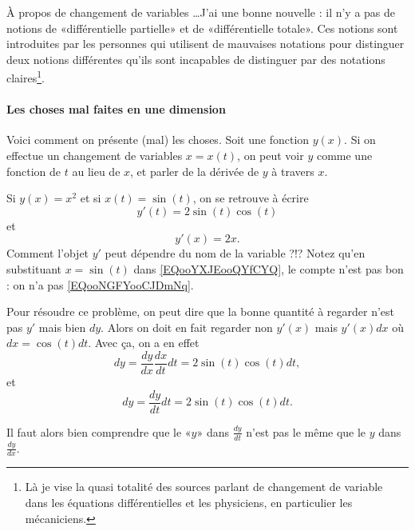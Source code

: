 \begin{normaltext}
	À propos de changement de variables \ldots J'ai une bonne nouvelle : il n'y a pas de notions de «différentielle partielle» et de «différentielle totale». Ces notions sont introduites par les personnes qui utilisent de mauvaises notations pour distinguer deux notions différentes qu'ils sont incapables de distinguer par des notations claires\footnote{Là je vise la quasi totalité des sources parlant de changement de variable dans les équations différentielles et les physiciens, en particulier les mécaniciens.}.
\end{normaltext}

\paragraph{Les choses mal faites en une dimension}

Voici comment on présente (mal) les choses. Soit une fonction \( y(x)\). Si on effectue un changement de variables \( x=x(t)\), on peut voir \( y\) comme une fonction de \( t\) au lieu de \( x\), et parler de la dérivée de \( y\) à travers \( x\).

Si \( y(x)=x^2\) et si \( x(t)=\sin(t)\), on se retrouve à écrire
\begin{equation}        \label{EQooNGFYooCJDmNq}
	y'(t)=2\sin(t)\cos(t)
\end{equation}
et
\begin{equation}        \label{EQooYXJEooQYfCYQ}
	y'(x)=2x.
\end{equation}
Comment l'objet \( y'\) peut dépendre du nom de la variable ?!? Notez qu'en substituant \( x=\sin(t)\) dans \eqref{EQooYXJEooQYfCYQ}, le compte n'est pas bon : on n'a pas \eqref{EQooNGFYooCJDmNq}.

Pour résoudre ce problème, on peut dire que la bonne quantité à regarder n'est pas \( y'\) mais bien \( dy\). Alors on doit en fait regarder non \( y'(x)\) mais \( y'(x)dx\) où \( dx=\cos(t)dt\). Avec ça, on a en effet
\begin{equation}
	dy=\frac{ dy }{ dx }\frac{ dx }{ dt }dt=2\sin(t)\cos(t)dt,
\end{equation}
et
\begin{equation}
	dy=\frac{ dy }{ dt }dt=2\sin(t)\cos(t)dt.
\end{equation}

Il faut alors bien comprendre que le «\( y\)» dans \( \frac{ dy }{ dt }\) n'est pas le même que le \( y\) dans \( \frac{ dy }{ dx }\).

